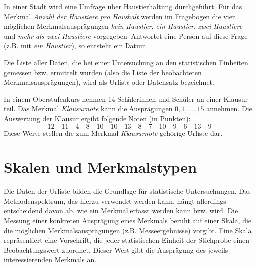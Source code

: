 \documentclass{lecture}
\begin{document}
    \begin{example}
        In einer Stadt wird eine Umfrage über Haustierhaltung durchgeführt.
        Für das Merkmal \emph{Anzahl der Haustiere pro Haushalt} werden im Fragebogen die vier möglichen Merkmalsausprägungen \emph{kein Haustier}, \emph{ein Haustier}, \emph{zwei Haustiere} und \emph{mehr als zwei Haustiere} vorgegeben.
        Antwortet eine Person auf diese Frage (z.B. mit \emph{ein Haustier}), so entsteht ein Datum.
    \end{example}

    Die Liste aller Daten, die bei einer Untersuchung an den statistischen Einheiten gemessen bzw. ermittelt wurden (also die Liste der beobachteten Merkmalsausprägungen), wird als Urliste oder Datensatz bezeichnet.

    \begin{example}
        In einem Oberstufenkurs nehmen 14 Schülerinnen und Schüler an einer Klausur teil.
        Das Merkmal \emph{Klausurnote} kann die Ausprägungen \(0, 1, \ldots, 15\) annehmen.
        Die Auswertung der Klausur ergibt folgende Noten (in Punkten):
        \[
            12 \quad 11 \quad 4 \quad 8 \quad 10 \quad 10 \quad 13 \quad 8 \quad 7 \quad 10 \quad 9 \quad 6 \quad 13 \quad 9
        \]
        Diese Werte stellen die zum Merkmal \emph{Klausurnote} gehörige Urliste dar.
    \end{example}


    \section*{Skalen und Merkmalstypen}

    Die Daten der Urliste bilden die Grundlage für statistische Untersuchungen.
    Das Methodenspektrum, das hierzu verwendet werden kann, hängt allerdings entscheidend davon ab, wie ein Merkmal erfasst werden kann bzw. wird.
    Die Messung einer konkreten Ausprägung eines Merkmals beruht auf einer Skala, die die möglichen Merkmalsausprägungen (z.B. Messeergebnisse) vorgibt.
    Eine Skala repräsentiert eine Vorschrift, die jeder statistischen Einheit der Stichprobe einen Beobachtungswert zuordnet.
    Dieser Wert gibt die Ausprägung des jeweils interessierenden Merkmals an.
    
\end{document}
